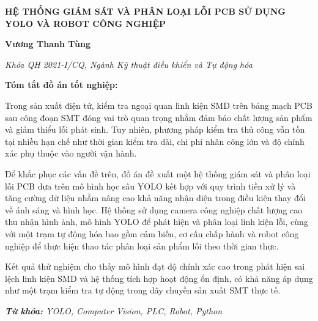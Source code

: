 \centering
\textbf{HỆ THỐNG GIÁM SÁT VÀ PHÂN LOẠI LỖI PCB SỬ DỤNG YOLO VÀ ROBOT CÔNG NGHIỆP}

\centering \textbf{\small Vương Thanh Tùng} \\ \vspace{6pt}

\centering \textit{\small Khóa QH 2021-I/CQ, Ngành Kỹ thuật điều khiển và Tự động hóa} \\ \vspace{18pt}

\justifying
\noindent\textbf{Tóm tắt đồ án tốt nghiệp:}

Trong sản xuất điện tử, kiểm tra ngoại quan linh kiện SMD trên bảng mạch PCB sau công đoạn SMT đóng vai trò quan trọng nhằm đảm bảo chất lượng sản phẩm và giảm thiểu lỗi phát sinh. Tuy nhiên, phương pháp kiểm tra thủ công vẫn tồn tại nhiều hạn chế như thời gian kiểm tra dài, chi phí nhân công lớn và độ chính xác phụ thuộc vào người vận hành. 

Để khắc phục các vấn đề trên, đồ án đề xuất một hệ thống giám sát và phân loại lỗi PCB dựa trên mô hình học sâu YOLO kết hợp với quy trình tiền xử lý và tăng cường dữ liệu nhằm nâng cao khả năng nhận diện trong điều kiện thay đổi về ánh sáng và hình học. Hệ thống sử dụng camera công nghiệp chất lượng cao thu nhận hình ảnh, mô hình YOLO để phát hiện và phân loại linh kiện lỗi, cùng với một trạm tự động hóa bao gồm cảm biến, cơ cấu chấp hành và robot công nghiệp để thực hiện thao tác phân loại sản phẩm lỗi theo thời gian thực.

Kết quả thử nghiệm cho thấy mô hình đạt độ chính xác cao trong phát hiện sai lệch linh kiện SMD và hệ thống tích hợp hoạt động ổn định, có khả năng áp dụng như một trạm kiểm tra tự động trong dây chuyền sản xuất SMT thực tế.

\noindent \textit{\textbf{Từ khóa:} YOLO, Computer Vision, PLC, Robot, Python}
